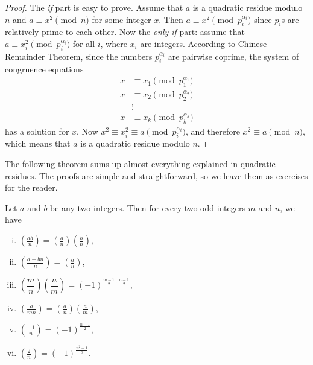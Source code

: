 \documentclass[main.tex]{subfile}
\begin{document}
	\begin{proof}
		The \textit{if} part is easy to prove. Assume that $a$ is a quadratic residue modulo $n$ and $a \equiv x^2 \pmod n$ for some integer $x$. Then $a \equiv x^2 \pmod{p_i^{\alpha_i}}$ since $p_i$s are relatively prime to each other. Now the \textit{only if} part: assume that $a \equiv x_i^2 \pmod{p_i^{\alpha_i}}$ for all $i$, where $x_i$ are integers. According to Chinese Remainder Theorem, since the numbers ${p_i^{\alpha_i}}$ are pairwise coprime, the system of congruence equations
		\begin{align*}
			x & \equiv x_1\pmod{p_1^{\alpha_1}}\\
			x & \equiv x_2\pmod{p_2^{\alpha_2}}\\
			& \vdots\\
			x & \equiv x_k\pmod{p_k^{\alpha_k}}
		\end{align*}
		has a solution for $x$. Now $x^2 \equiv x_i^2 \equiv a \pmod{p_i^{\alpha_i}}$, and therefore $x^2 \equiv a \pmod n$, which means that $a$ is a quadratic residue modulo $n$.
	\end{proof}

	The following theorem sums up almost everything explained in quadratic residues. The proofs are simple and straightforward, so we leave them as exercises for the reader.
		\begin{theorem}
			Let $a$ and $b$ be any two integers. Then for every two odd integers $m$ and $n$, we have
			\begin{enumerate}[i.]
				\item $\displaystyle \left(\frac{ab}{n}\right) = \left(\frac{a}{n}\right) \left(\frac{b}{n}\right)$,
				\item $\displaystyle \left(\frac{a+bn}{n}\right) = \left(\frac{a}{n}\right)$,
				\item $\displaystyle \left(\dfrac{m}{n}\right)\left(\dfrac{n}{m}\right)=(-1)^{\frac{m-1}{2}\cdot \frac{n-1}{2}}$,
				\item $\displaystyle \left(\frac{a}{mn}\right) = \left(\frac{a}{n}\right) \left(\frac{a}{m}\right)$,
				\item $\displaystyle \left(\frac{-1}{n}\right) = (-1)^{\frac{n-1}{2}}$,
				\item $\displaystyle \left(\frac{2}{n}\right) = (-1)^{\frac{n^2-1}{8}}$.
			\end{enumerate}
		\end{theorem}
\end{document}
